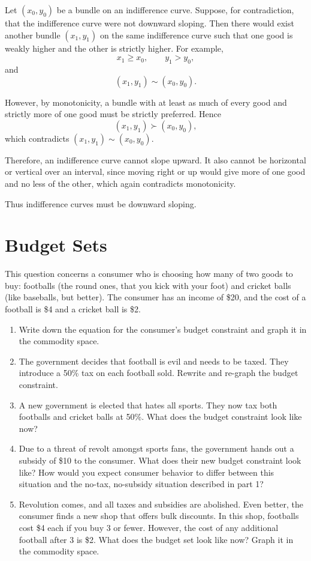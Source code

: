 \documentclass[12pt,a4paper]{article}
\begin{document}
Let $(x_0,y_0)$ be a bundle on an indifference curve. Suppose, for contradiction, that the indifference curve were not downward sloping. Then there would exist another bundle $(x_1,y_1)$ on the same indifference curve such that one good is weakly higher and the other is strictly higher. For example,
\[
x_1 \ge x_0,\qquad y_1>y_0,
\]
and
\[
(x_1,y_1)\sim (x_0,y_0).
\]

However, by monotonicity, a bundle with at least as much of every good and strictly more of one good must be strictly preferred. Hence
\[
(x_1,y_1)\succ (x_0,y_0),
\]
which contradicts $(x_1,y_1)\sim (x_0,y_0)$.

Therefore, an indifference curve cannot slope upward. It also cannot be horizontal or vertical over an interval, since moving right or up would give more of one good and no less of the other, which again contradicts monotonicity.

Thus indifference curves must be downward sloping.

\section{Budget Sets}
This question concerns a consumer who is choosing how many of two goods to buy: footballs (the round ones, that you kick with your foot) and cricket balls (like baseballs, but better). The consumer has an income of \$20, and the cost of a football is \$4 and a cricket ball is \$2.

\begin{enumerate}
  \item Write down the equation for the consumer's budget constraint and graph it in the commodity space.
  \item The government decides that football is evil and needs to be taxed. They introduce a 50\% tax on each football sold. Rewrite and re-graph the budget constraint.
  \item A new government is elected that hates all sports. They now tax both footballs and cricket balls at 50\%. What does the budget constraint look like now?
  \item Due to a threat of revolt amongst sports fans, the government hands out a subsidy of \$10 to the consumer. What does their new budget constraint look like? How would you expect consumer behavior to differ between this situation and the no-tax, no-subsidy situation described in part 1?
  \item Revolution comes, and all taxes and subsidies are abolished. Even better, the consumer finds a new shop that offers bulk discounts. In this shop, footballs cost \$4 each if you buy 3 or fewer. However, the cost of any additional football after 3 is \$2. What does the budget set look like now? Graph it in the commodity space.
\end{enumerate}
\end{document}
